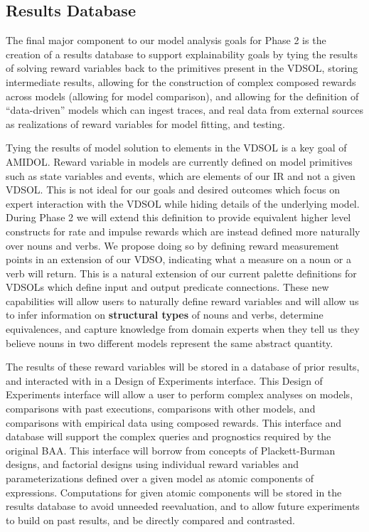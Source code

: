 \documentclass[11pt]{article}
\newcommand{\amidol}{\textsc{AMIDOL}}
\begin{document}
\subsection{Results Database}

The final major component to our model analysis goals for Phase 2 is
the creation of a results database to support explainability goals by
tying the results of solving reward variables back to the primitives
present in the VDSOL, storing intermediate results, allowing for the
construction of complex composed rewards across models (allowing for
model comparison), and allowing for the definition of ``data-driven''
models which can ingest traces, and real data from external sources as
realizations of reward variables for model fitting, and testing.

Tying the results of model solution to elements in the VDSOL is a key
goal of \amidol{}. Reward variable in models are currently defined on
model primitives such as
state variables and events, which are elements of our IR and not a
given VDSOL.  This is not ideal for our goals and desired outcomes
which focus on expert interaction with the VDSOL while hiding details
of the underlying model.  During Phase 2 we will extend this
definition to provide equivalent higher level constructs for rate and
impulse rewards which are instead defined more naturally over nouns
and verbs.  We propose doing so by defining reward measurement points in an
extension of our VDSO, indicating what a measure on a noun or a
verb will return.  This is a natural extension of our current palette
definitions for VDSOLs which define input and output predicate
connections. These new capabilities will allow users to naturally
define reward variables and will allow us to infer information on
\textbf{structural types} of nouns and verbs, determine equivalences,
and capture knowledge from domain experts when they tell us they
believe nouns in two different models represent the same abstract
quantity.

The results of these reward variables will be stored in a database of
prior results, and interacted with in a Design of Experiments
interface.  This Design of Experiments interface will allow a user to perform
complex analyses on models, comparisons with past executions,
comparisons with other models, and comparisons with empirical data
using composed rewards.  This interface and database will support the
complex queries and prognostics required by the original BAA.  This interface
will borrow from concepts of Plackett-Burman
designs, and factorial designs using individual reward variables and
parameterizations defined over a given model as atomic components of
expressions.  Computations for given atomic components will be stored
in the results database to avoid unneeded reevaluation, and to allow
future experiments to build on past results, and be directly compared
and contrasted.
\end{document}
